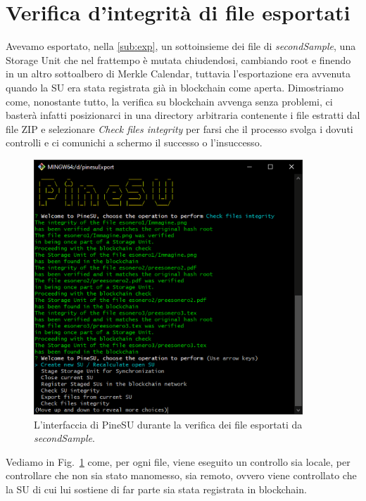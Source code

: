 \section{Verifica d'integrità di file esportati}
Avevamo esportato, nella \autoref{sub:exp}, un sottoinsieme dei file di \emph{secondSample},
una Storage Unit che nel frattempo è mutata chiudendosi, cambiando root e finendo in un
altro sottoalbero di Merkle Calendar, tuttavia l'esportazione era avvenuta quando la SU
era stata registrata già in blockchain come aperta.
Dimostriamo come, nonostante tutto, la verifica su blockchain avvenga senza problemi,
ci basterà infatti posizionarci in una directory arbitraria contenente i file estratti
dal file ZIP e selezionare \emph{Check files integrity} per farsi che il processo svolga i
dovuti controlli e ci comunichi a schermo il successo o l'insuccesso.

\begin{figure}[H]
    \centering
    \includegraphics[width=0.9\textwidth]{Figures/verifyFiles}
    \caption{\small{
    L'interfaccia di PineSU durante la verifica dei file esportati da \emph{secondSample}.
    } %
    } %
    \label{fi:vfil}
\end{figure}

Vediamo in Fig.~\ref{fi:vfil} come, per ogni file, viene eseguito un controllo sia locale,
per controllare che non sia stato manomesso, sia remoto, ovvero viene controllato che la SU
di cui lui sostiene di far parte sia stata registrata in blockchain.

